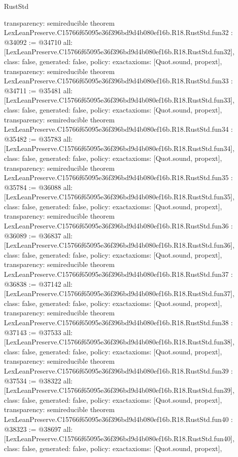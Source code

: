 \begin{lexlean}{RustStd}
\begin{coremodule}
{  transparency: semireducible
}
theorem LexLeanPreserve.C15766f65095e36f396bd9d4b080ef16b.R18.RustStd.fun32 : @34092 := @34710 {
  all: [LexLeanPreserve.C15766f65095e36f396bd9d4b080ef16b.R18.RustStd.fun32],
  class: false,
  generated: false,
  policy: exact{axioms: [Quot.sound, propext]},
  transparency: semireducible
}
theorem LexLeanPreserve.C15766f65095e36f396bd9d4b080ef16b.R18.RustStd.fun33 : @34711 := @35481 {
  all: [LexLeanPreserve.C15766f65095e36f396bd9d4b080ef16b.R18.RustStd.fun33],
  class: false,
  generated: false,
  policy: exact{axioms: [Quot.sound, propext]},
  transparency: semireducible
}
theorem LexLeanPreserve.C15766f65095e36f396bd9d4b080ef16b.R18.RustStd.fun34 : @35482 := @35783 {
  all: [LexLeanPreserve.C15766f65095e36f396bd9d4b080ef16b.R18.RustStd.fun34],
  class: false,
  generated: false,
  policy: exact{axioms: [Quot.sound, propext]},
  transparency: semireducible
}
theorem LexLeanPreserve.C15766f65095e36f396bd9d4b080ef16b.R18.RustStd.fun35 : @35784 := @36088 {
  all: [LexLeanPreserve.C15766f65095e36f396bd9d4b080ef16b.R18.RustStd.fun35],
  class: false,
  generated: false,
  policy: exact{axioms: [Quot.sound, propext]},
  transparency: semireducible
}
theorem LexLeanPreserve.C15766f65095e36f396bd9d4b080ef16b.R18.RustStd.fun36 : @36089 := @36837 {
  all: [LexLeanPreserve.C15766f65095e36f396bd9d4b080ef16b.R18.RustStd.fun36],
  class: false,
  generated: false,
  policy: exact{axioms: [Quot.sound, propext]},
  transparency: semireducible
}
theorem LexLeanPreserve.C15766f65095e36f396bd9d4b080ef16b.R18.RustStd.fun37 : @36838 := @37142 {
  all: [LexLeanPreserve.C15766f65095e36f396bd9d4b080ef16b.R18.RustStd.fun37],
  class: false,
  generated: false,
  policy: exact{axioms: [Quot.sound, propext]},
  transparency: semireducible
}
theorem LexLeanPreserve.C15766f65095e36f396bd9d4b080ef16b.R18.RustStd.fun38 : @37143 := @37533 {
  all: [LexLeanPreserve.C15766f65095e36f396bd9d4b080ef16b.R18.RustStd.fun38],
  class: false,
  generated: false,
  policy: exact{axioms: [Quot.sound, propext]},
  transparency: semireducible
}
theorem LexLeanPreserve.C15766f65095e36f396bd9d4b080ef16b.R18.RustStd.fun39 : @37534 := @38322 {
  all: [LexLeanPreserve.C15766f65095e36f396bd9d4b080ef16b.R18.RustStd.fun39],
  class: false,
  generated: false,
  policy: exact{axioms: [Quot.sound, propext]},
  transparency: semireducible
}
theorem LexLeanPreserve.C15766f65095e36f396bd9d4b080ef16b.R18.RustStd.fun40 : @38323 := @38697 {
  all: [LexLeanPreserve.C15766f65095e36f396bd9d4b080ef16b.R18.RustStd.fun40],
  class: false,
  generated: false,
  policy: exact{axioms: [Quot.sound, propext]},
}
\end{coremodule}
\end{lexlean}
